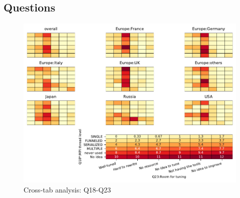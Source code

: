
\subsection{Questions}


\begin{figure}
\begin{center}
\includegraphics[width=12cm]{../pdfs/Q18-Q23.pdf}
\caption{Cross-tab analysis: Q18-Q23}
\label{fig:Q18-Q23}
\end{center}
\end{figure}

